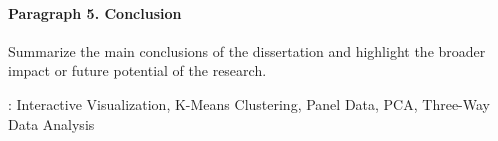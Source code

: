 
\paragraph{Paragraph 5. Conclusion}

Summarize the main conclusions of the dissertation and highlight the broader impact or future potential of the research.

\bigskip

\noindent %

\vspace*{0.5cm}

\noindent {}: Interactive Visualization, K-Means Clustering, Panel Data, PCA, Three-Way Data Analysis\\


\newpage 